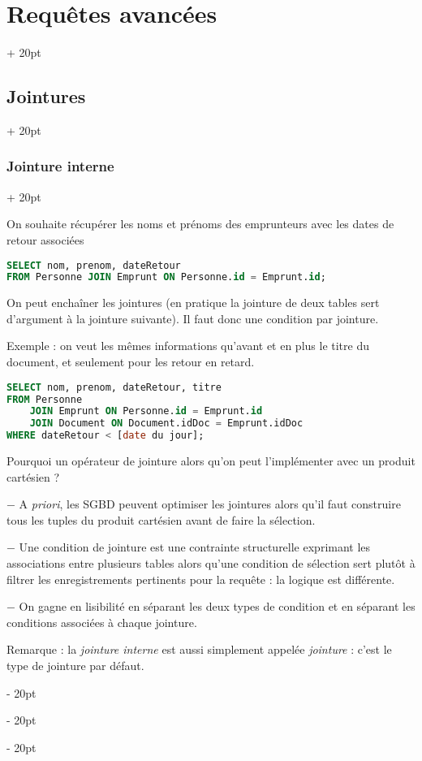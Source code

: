 \documentclass[a4paper, 12pt, twoside]{article}
\newcommand{\ind}[1][20pt]{\advance\leftskip + #1}
\newcommand{\deind}[1][20pt]{\advance\leftskip - #1}
\newenvironment{indt}[2][20pt]{#2 \par \ind[#1]}{\par \deind} %
\begin{document}
\begin{indt}{\section{Requêtes avancées}}
\begin{indt}{\subsection{Jointures}}
\begin{indt}{\subsubsection{Jointure interne}}
                \vspace{12pt}
                
                On souhaite récupérer les noms et prénoms des emprunteurs avec les dates de retour associées

                \begin{lstlisting}[language=SQL, xleftmargin=80pt]
SELECT nom, prenom, dateRetour
FROM Personne JOIN Emprunt ON Personne.id = Emprunt.id;\end{lstlisting}
                
                On peut enchaîner les jointures (en pratique la jointure de deux tables sert d'argument à la jointure suivante). Il faut donc une condition par jointure.

                Exemple : on veut les mêmes informations qu'avant et en plus le titre du document, et seulement pour les retour en retard.

                \begin{lstlisting}[language=SQL, xleftmargin=80pt]
SELECT nom, prenom, dateRetour, titre
FROM Personne
    JOIN Emprunt ON Personne.id = Emprunt.id
    JOIN Document ON Document.idDoc = Emprunt.idDoc
WHERE dateRetour < [date du jour];\end{lstlisting}

                \vspace{6pt}
                
                Pourquoi un opérateur de jointure alors qu'on peut l'implémenter avec un produit cartésien ?

                \vspace{6pt}
                
                $-$ A \textit{priori}, les SGBD peuvent optimiser les jointures alors qu'il faut construire tous les tuples du produit cartésien avant de faire la sélection.

                $-$ Une condition de jointure est une contrainte structurelle exprimant les associations entre plusieurs tables alors qu'une condition de sélection sert plutôt à filtrer les enregistrements pertinents pour la requête : la logique est différente.

                $-$ On gagne en lisibilité en séparant les deux types de condition et en séparant les conditions associées à chaque jointure.

                \vspace{12pt}
                
                Remarque : la \textit{jointure interne} est aussi simplement appelée \textit{jointure} : c'est le type de jointure par défaut.
            \end{indt}


\end{indt}
\end{indt}
\end{document}
